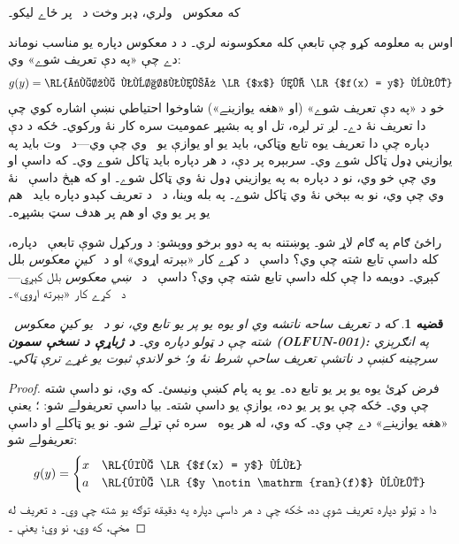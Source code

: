 \documentclass[12pt,a4paper,oneside]{report}
\newcommand{\ran}[1]{\mathrm{ran}(#1)}
\newenvironment{explain}{}{}
\newtheorem{prop}[defn]{قضيه}
\begin{document}
که  معکوس~ ولري، ډېر وخت د~ پر ځاے  ليکو۔

\begin{explain}
اوس به معلومه کړو چې تابعې کله معکوسونه لري۔ د 
د معکوس دپاره يو مناسب نوماند  دے چې «په دې
تعريف شوے» وي:
\[
g(y) = \text{\RL{«هغه يوازينے» \LR{$x$} چې \LR{$f(x) = y$} وي۔}}
\]
خو د «په دې تعريف شوے» (او «هغه يوازينے») شاوخوا احتياطي نښې
اشاره کوي چې دا تعريف نۀ دے۔ لږ تر لږه، تل او په بشپړ عموميت
سره کار نۀ ورکوي۔ ځکه د دې دپاره چې دا تعريف يوه تابع وټاکي،
بايد يو او يوازې يو~ وي چې  وي---د~ وت بايد په
يوازيني ډول ټاکل شوے وي۔ سربېره پر دې، د هر  دپاره
بايد ټاکل شوے وي۔ که داسې  او  وي چې
 خو  وي، نو د
 دپاره به  په يوازيني ډول نۀ وي
ټاکل شوے۔ او که هېڅ داسې~ نۀ وي چې  وي، نو 
به بېخي نۀ وي ټاکل شوے۔ په بله وينا، د~ د تعريف کېدو دپاره
بايد~ هم يو پر يو وي او هم پر هدف سټ بشپړه۔

راځئ ګام په ګام لاړ شو۔ پوښتنه به په دوو برخو ووېشو: د ورکړل
شوې تابعې~ دپاره، کله داسې تابع 
شته چې  وي؟ داسې~ د  کړے کار «بېرته اړوي»
او د~ \emph{کيڼ معکوس} بلل کېږي۔ دويمه دا چې کله داسې تابع
 شته چې  وي؟ داسې~ د~
\emph{ښي معکوس} بلل کېږي--- د~ کړے کار «بېرته اړوي»۔
\end{explain}

\begin{prop}
که د تعريف ساحه ناتشه وي او  يوه يو پر يو تابع وي، نو د~ يو
\emph{کيڼ معکوس}~ شته چې د ټولو 
دپاره  وي۔
\textbf{د ژباړې د نسخې سمون (OLFUN-001):} په انګرېزي سرچينه کښې
د ناتشې تعريف ساحې شرط نۀ و؛ خو لاندې ثبوت يو غړے ترې ټاکي۔
\end{prop}

\begin{proof}
فرض کړئ  يوه يو پر يو تابع ده۔ يو 
په پام کښې ونيسئ۔ که \LR{$y \in \ran{f}$} وي، نو داسې  شته
چې  وي۔ ځکه چې  يو پر يو ده، يوازې يو داسې
 شته۔ بيا داسې تعريفولے شو: ؛ يعنې 
«هغه يوازينے»  دے چې  وي۔ که
\LR{$y \notin \ran{f}$} وي، له هر يوه~ سره ئې تړلے شو۔ نو
يو  ټاکلے او  داسې تعريفولے شو:
\[
g(y) = \begin{cases}
    x & \text{\RL{که \LR{$f(x) = y$} وي}}\\
    a & \text{\RL{که \LR{$y \notin \ran{f}$} وي۔}}
\end{cases}
\]
دا د ټولو  دپاره تعريف شوې ده، ځکه چې د هر داسې
\LR{$y \in \ran{f}$} دپاره په دقيقه توګه يو  شته چې
 وي۔ د تعريف له مخې، که  وي، نو 
وي؛ يعنې ۔
\end{proof}
\end{document}
